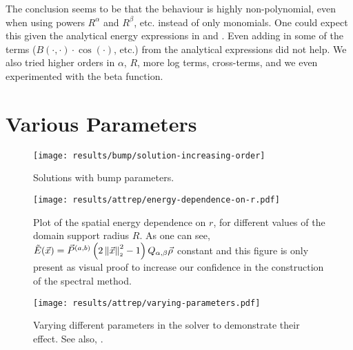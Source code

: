 The conclusion seems to be that the behaviour is highly non-polynomial, even when using powers $R^\alpha$ and $R^\beta$, etc. instead of only monomials.
One could expect this given the analytical energy expressions in  and \cite{2017-explicit-solutions}.
Even adding in some of the terms ($B(\cdot, \cdot) \cdot \cos(\cdot)$, etc.) from the analytical expressions did not help.
We also tried higher orders in $\alpha$, $R$, more log terms, cross-terms, and we even experimented with the beta function.

\chapter{Various Parameters}
\label{chap:appendix}

\begin{figure}[H]
  \centering
  \texttt{[image: results/bump/solution-increasing-order]}
  \caption[Bump parameter solutions]{Solutions with bump parameters.}
  \label{fig:bump-solutions}
\end{figure}

\begin{figure}[H]
  \centering
  \texttt{[image: results/attrep/energy-dependence-on-r.pdf]}
  \caption[Spatial energy dependence on $r$]{Plot of the spatial energy dependence on $r$, for different values of the domain support radius $R$. As one can see, $\tilde{E}(\vec{x}) = \vec{P}^{(a, b)}\left(2 \left\lVert\vec{x}\right\rVert_{\scriptscriptstyle 2}^2 - 1\right) Q_{\alpha,\beta} \vec{\rho}$ constant and this figure is only present as visual proof to increase our confidence in the construction of the spectral method.}
  \label{fig:spatial-energy-dependence}
\end{figure}

\pagebreak
\begin{figure}[H]
  \centering
  \texttt{[image: results/attrep/varying-parameters.pdf]}
  \caption[Varying parameters in the solver]{
    Varying different parameters in the solver to demonstrate their effect.
    See also, .
  }
  \label{fig:varying-parameters}
\end{figure}
\pagebreak



